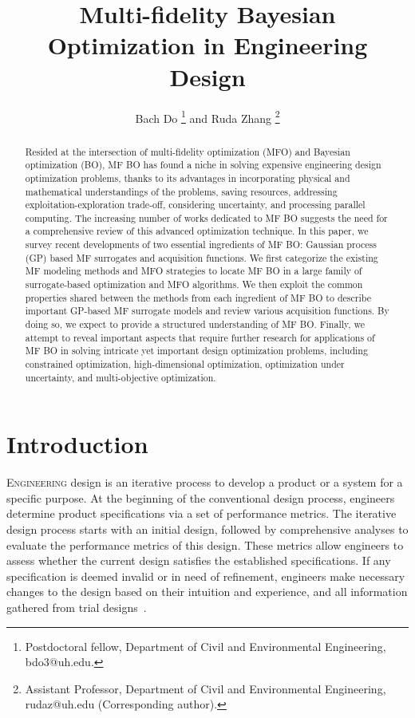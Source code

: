\documentclass[journal ]{new-aiaa}
\title{Multi-fidelity Bayesian Optimization in Engineering Design}
\author{Bach Do \footnote{Postdoctoral fellow, Department of Civil and Environmental Engineering, bdo3@uh.edu.} and Ruda Zhang \footnote{Assistant Professor, Department of Civil and Environmental Engineering, rudaz@uh.edu (Corresponding author).}}
\affil{University of Houston, Houston, TX 77204-4003, USA}
\begin{document}
\maketitle

\begin{abstract}
Resided at the intersection of multi-fidelity optimization (MFO) and Bayesian optimization (BO), MF BO has found a niche in solving expensive engineering design optimization problems, thanks to its advantages in incorporating physical and mathematical understandings of the problems, saving resources, addressing exploitation-exploration trade-off, considering uncertainty, and processing parallel computing.
The increasing number of works dedicated to MF BO suggests the need for a comprehensive review of this advanced optimization technique.   
In this paper, we survey recent developments of two essential ingredients of MF BO: Gaussian process (GP) based MF surrogates and acquisition functions.
We first categorize the existing MF modeling methods and MFO strategies to locate MF BO in a large family of surrogate-based optimization and MFO algorithms.
We then exploit the common properties shared between the methods from each ingredient of MF BO to describe important GP-based MF surrogate models and review various acquisition functions.
By doing so, we expect to provide a structured understanding of MF BO.
Finally, we attempt to reveal important aspects that require further research for applications of MF BO in solving intricate yet important design optimization problems, including constrained optimization, high-dimensional optimization, optimization under uncertainty, and multi-objective optimization.
\end{abstract}

\tableofcontents

\section{Introduction}\label{Sec1}
\lettrine{E}{ngineering} design is an iterative process to develop a product or a system for a specific purpose.
At the beginning of the conventional design process, engineers determine product specifications via a set of performance metrics.
The iterative design process starts with an initial design, followed by comprehensive analyses to evaluate the performance metrics of this design.
These metrics allow engineers to assess whether the current design satisfies the established specifications.
If any specification is deemed invalid or in need of refinement, engineers make necessary changes to the design based on their intuition and experience, and all information gathered from trial designs~\cite{Arora2016}.
\end{document}
